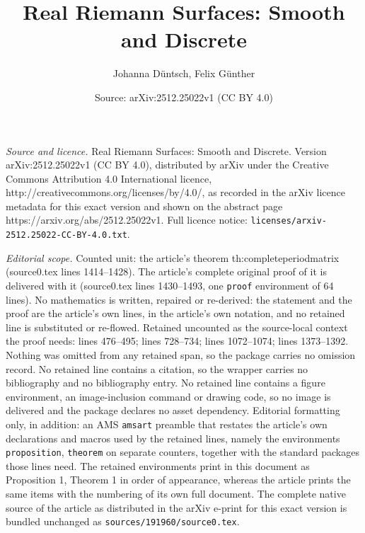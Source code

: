 \documentclass[10pt,a4paper]{amsart}
\title{Real Riemann Surfaces: Smooth and Discrete}
\author{Johanna D\"untsch, Felix G\"unther}
\date{Source: arXiv:2512.25022v1 (CC BY 4.0)}
\begin{document}
\maketitle

\noindent\emph{Source and licence.} Real Riemann Surfaces: Smooth and Discrete. Version arXiv:2512.25022v1 (CC BY 4.0), distributed by arXiv under the Creative Commons Attribution 4.0 International licence, http://creativecommons.org/licenses/by/4.0/, as recorded in the arXiv licence metadata for this exact version and shown on the abstract page https://arxiv.org/abs/2512.25022v1. Full licence notice: \texttt{licenses/arxiv-2512.25022-CC-BY-4.0.txt}.\par\smallskip

\noindent\textit{Editorial scope.} Counted unit: the article's theorem th:completeperiodmatrix (source0.tex lines 1414--1428). The article's complete original proof of it is delivered with it (source0.tex lines 1430--1493, one \texttt{proof} environment of 64 lines). No mathematics is written, repaired or re-derived: the statement and the proof are the article's own lines, in the article's own notation, and no retained line is substituted or re-flowed.  Retained uncounted as the source-local context the proof needs: lines 476--495; lines 728--734; lines 1072--1074; lines 1373--1392.  Nothing was omitted from any retained span, so the package carries no omission record.  No retained line contains a citation, so the wrapper carries no bibliography and no bibliography entry.  No retained line contains a figure environment, an image-inclusion command or drawing code, so no image is delivered and the package declares no asset dependency.  Editorial formatting only, in addition: an AMS \texttt{amsart} preamble that restates the article's own declarations and macros used by the retained lines, namely the environments \texttt{proposition}, \texttt{theorem} on separate counters, together with the standard packages those lines need.  The retained environments print in this document as Proposition 1, Theorem 1 in order of appearance, whereas the article prints the same items with the numbering of its own full document.  The complete native source of the article as distributed in the arXiv e-print for this exact version is bundled unchanged as \texttt{sources/191960/source0.tex}.
\end{document}
